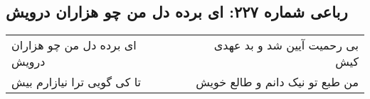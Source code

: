 \begin{center}
\section*{رباعی شماره ۲۲۷: ای برده دل من چو هزاران درویش}
\label{sec:sh227}
\begin{longtable}{l p{0.5cm} r}
ای برده دل من چو هزاران درویش
&&
بی رحمیت آیین شد و بد عهدی کیش
\\
تا کی گویی ترا نیازارم بیش
&&
من طبع تو نیک دانم و طالع خویش
\\
\end{longtable}
\end{center}
